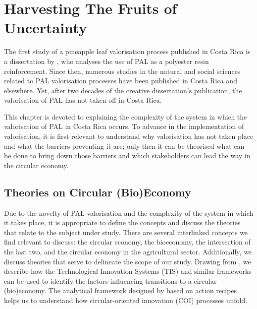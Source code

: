 \chapter{Harvesting The Fruits of Uncertainty}
\label{chapter_3lab}

The first study of a pineapple leaf valorisation process published in Costa Rica is a dissertation by \cite{quesada2003utilizacion}, who analyses the use of PAL as a polyester resin reinforcement. Since then, numerous studies in the natural and social sciences related to PAL valorisation processes have been published in Costa Rica and elsewhere. Yet, after two decades of the creative dissertation's publication, the valorisation of PAL has not taken off in Costa Rica. 

This chapter is devoted to explaining the complexity of the system in which the valorisation of PAL in Costa Rica occurs. To advance in the implementation of valorisation, it is first relevant to understand why valorisation has not taken place and what the barriers preventing it are; only then it can be theorised what can be done to bring down those barriers and which stakeholders can lead the way in the circular economy.

\section{Theories on Circular (Bio)Economy}
\label{theoryframe}

 Due to the novelty of PAL valorisation and the complexity of the system in which it takes place, it is appropriate to define the concepts and discuss the theories that relate to the subject under study. There are several interlinked concepts we find relevant to discuss: the circular economy, the bioeconomy, the intersection of the last two, and the circular economy in the agricultural sector. Additionally, we discuss theories that serve to delineate the scope of our study.  Drawing from \cite{gottinger2020studying}, we describe how the Technological Innovation Systems (TIS) and similar frameworks can be used to identify the factors influencing transitions to a circular (bio)economy. The analytical framework designed by \cite{blomsma2022making} based on action recipes helps us to understand how circular-oriented innovation (COI) processes unfold.


